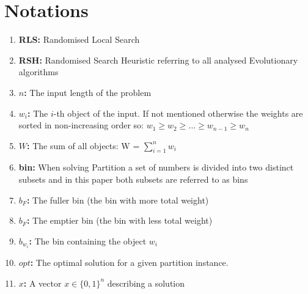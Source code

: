 \section{Notations}
\begin{enumerate}
    \item \textbf{RLS:} Randomised Local Search
    \item \textbf{RSH:} Randomised Search Heuristic referring to all analysed Evolutionary algorithms
    \item \textbf{$n$:} The input length of the problem
    \item \textbf{$w_i$:} The $i$-th object of the input. If not mentioned otherwise the weights are sorted in non-increasing order so: \(w_1 \ge w_2 \ge \ldots \ge w_{n-1} \ge w_{n}\)
    \item \textbf{$W$:} The sum of all objects: W = $\sum_{i=1}^{n}w_i$
    \item \textbf{bin:} When solving Partition a set of numbers is divided into two distinct subsets and in this paper both subsets are referred to as bins
    \item \textbf{$b_F$:} The fuller bin (the bin with more total weight)
    \item \textbf{$b_F$:} The emptier bin (the bin with less total weight)
    \item \textbf{$b_{w_i}$:} The bin containing the object $w_i$
    \item \textbf{$opt$:} The optimal solution for a given partition instance.
    \item \textbf{$x$:} A vector $x \in {\{0, 1\}}^n$ describing a solution
\end{enumerate}